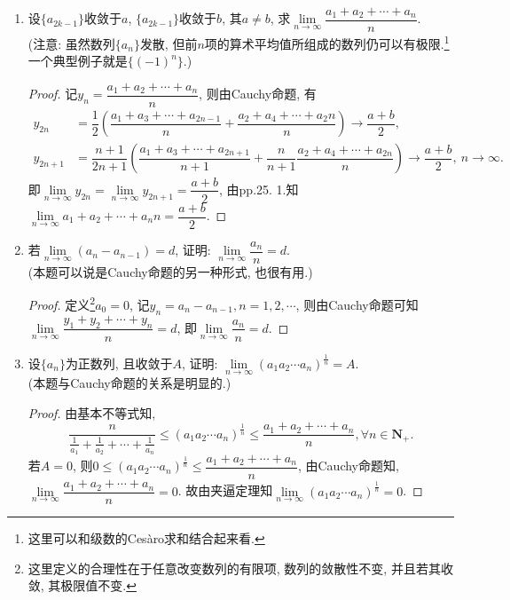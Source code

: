 \documentclass[a4paper,11pt,twoside]{ctexbook}
\begin{document}
\begin{enumerate}
\begin{proof}
	      \end{proof}
	\item 设$\{a_{2k-1}\}$收敛于$a$, $\{a_{2k-1}\}$收敛于$b$, 其$a\neq b$, 求$\lim\limits_{n\to\infty} \dfrac{a_1+a_2+\cdots+a_n}{n}$.\\
	      (注意: 虽然数列$\{a_n\}$发散, 但前$n$项的算术平均值所组成的数列仍可以有极限.\footnote{这里可以和级数的Ces\`aro求和结合起来看.} 一个典型例子就是$\{(-1)^n\}$.)
	      \begin{proof}
		      记$y_n=\dfrac{a_1+a_2+\cdots+a_n}{n}$, 则由Cauchy命题, 有
		      \begin{equation*}
			      \begin{split}
				      y_{2n}&=\dfrac{1}{2}\left(\dfrac{a_1+a_3+\cdots+a_{2n-1}}{n}+\dfrac{a_2+a_4+\cdots+a_2n}{n}\right)\to\dfrac{a+b}{2},\\
				      y_{2n+1}&=\dfrac{n+1}{2n+1}\left(\dfrac{a_1+a_3+\cdots+a_{2n+1}}{n+1}+\dfrac{n}{n+1}\dfrac{a_2+a_4+\cdots+a_{2n}}{n}\right)\to\dfrac{a+b}{2},\ n\to\infty.
			      \end{split}
		      \end{equation*}
		      即$\lim\limits_{n\to\infty} y_{2n}=\lim\limits_{n\to\infty} y_{2n+1}=\dfrac{a+b}{2}$, 由pp.25. 1.知$\lim\limits_{n\to\infty} {a_1+a_2+\cdots+a_n}{n}=\dfrac{a+b}{2}$.\qedhere
	      \end{proof}
	\item 若$\lim\limits_{n\to\infty} (a_n-a_{n-1})=d$, 证明: $\lim\limits_{n\to\infty} \dfrac{a_n}{n}=d$.\\
	      (本题可以说是Cauchy命题的另一种形式, 也很有用.)
	      \begin{proof}
		      定义\footnote{这里定义的合理性在于任意改变数列的有限项, 数列的敛散性不变, 并且若其收敛, 其极限值不变.}$a_0=0$, 记$y_n=a_n-a_{n-1}, n=1,2,\cdots$, 则由Cauchy命题可知$\lim\limits_{n\to\infty} \dfrac{y_1+y_2+\cdots+y_n}{n}=d$, 即$\lim\limits_{n\to\infty} \dfrac{a_n}{n}=d$.\qedhere
	      \end{proof}
	\item 设$\{a_n\}$为正数列, 且收敛于$A$, 证明: $\lim\limits_{n\to\infty} (a_1a_2\cdots a_n)^\frac{1}{n}=A$.\\
	      (本题与Cauchy命题的关系是明显的.)
	      \begin{proof}
		      由基本不等式知,
		      \[
			      \dfrac{n}{\frac{1}{a_1}+\frac{1}{a_2}+\cdots+\frac{1}{a_n}}\leqslant(a_1a_2\cdots a_n)^{\frac{1}{n}}\leqslant\dfrac{a_1+a_2+\cdots+a_n}{n}, \forall n\in\mathbf{N}_{+}.
		      \]
		      若$A=0$, 则$0\leqslant(a_1a_2\cdots a_n)^{\frac{1}{n}}\leqslant\dfrac{a_1+a_2+\cdots+a_n}{n}$, 由Cauchy命题知, $\lim\limits_{n\to\infty} \dfrac{a_1+a_2+\cdots+a_n}{n}=0$. 故由夹逼定理知$\lim\limits_{n\to\infty} (a_1a_2\cdots a_n)^\frac{1}{n}=0$.


\end{proof}
\end{enumerate}
\end{document}
